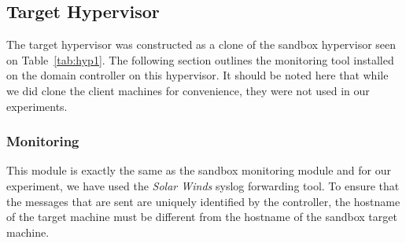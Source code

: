 \subsection{Target Hypervisor} \label{sec:target}
The target hypervisor was constructed as a clone of the sandbox hypervisor seen
on Table~\ref{tab:hyp1}.  The following section outlines the monitoring tool
installed on the domain controller on this hypervisor.  It should be noted here
that while we did clone the client machines for convenience, they were not used
in our experiments.

\subsubsection{Monitoring} \label{sec:targetMonitoringTool}
This module is exactly the same as the sandbox monitoring module and for our
experiment, we have used the \emph{Solar Winds} syslog forwarding tool.  To
ensure that the messages that are sent are uniquely identified by the
controller, the hostname of the target machine must be different from the
hostname of the sandbox target machine.

\setcounter{secnumdepth}{1}

